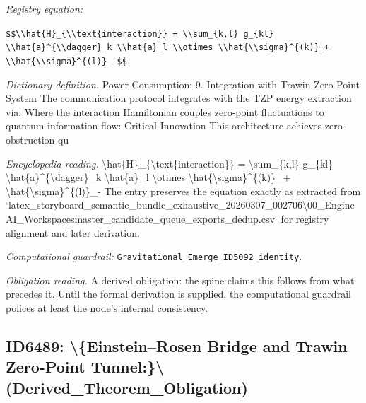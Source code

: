 \documentclass[11pt]{article}
\theoremstyle{remark}
\begin{document}
\noindent\textit{Registry equation:}\par
{\small\texttt{\$\$\textbackslash{}\textbackslash{}hat\{H\}\_\{\textbackslash{}\textbackslash{}text\{interaction\}\} = \textbackslash{}\textbackslash{}sum\_\{k,l\} g\_\{kl\} \textbackslash{}\textbackslash{}hat\{a\}\textasciicircum{}\{\textbackslash{}\textbackslash{}dagger\}\_k \textbackslash{}\textbackslash{}hat\{a\}\_l \textbackslash{}\textbackslash{}otimes \textbackslash{}\textbackslash{}hat\{\textbackslash{}\textbackslash{}sigma\}\textasciicircum{}\{(k)\}\_+ \textbackslash{}\textbackslash{}hat\{\textbackslash{}\textbackslash{}sigma\}\textasciicircum{}\{(l)\}\_-\$\$}}\par\medskip
\noindent\textit{Dictionary definition.} Power Consumption: 9. Integration with Trawin Zero Point System The communication protocol integrates with the TZP energy extraction via: Where the interaction Hamiltonian couples zero-point fluctuations to quantum information flow: Critical Innovation This architecture achieves zero-obstruction qu\par\medskip
\noindent\textit{Encyclopedia reading.} \textbackslash{}hat\{H\}\_\{\textbackslash{}text\{interaction\}\} = \textbackslash{}sum\_\{k,l\} g\_\{kl\} \textbackslash{}hat\{a\}\textasciicircum{}\{\textbackslash{}dagger\}\_k \textbackslash{}hat\{a\}\_l \textbackslash{}otimes \textbackslash{}hat\{\textbackslash{}sigma\}\textasciicircum{}\{(k)\}\_+ \textbackslash{}hat\{\textbackslash{}sigma\}\textasciicircum{}\{(l)\}\_- The entry preserves the equation exactly as extracted from `latex\_storyboard\_semantic\_bundle\_exhaustive\_20260307\_002706\textbackslash{}00\_EngineAI\_Workspacesmaster\_candidate\_queue\_exports\_dedup.csv` for registry alignment and later derivation.
\par\medskip\noindent\textit{Computational guardrail:} \texttt{Gravitational\_Emerge\_ID5092\_identity}.
\par\medskip\noindent\textit{Obligation reading.} A derived obligation: the spine claims this follows from what precedes it. Until the formal derivation is supplied, the computational guardrail polices at least the node's internal consistency.

\subsection{ID6489: \textbackslash{}\{Einstein--Rosen Bridge and Trawin Zero-Point Tunnel:\}\textbackslash{} (Derived\_Theorem\_Obligation)}
\end{document}
